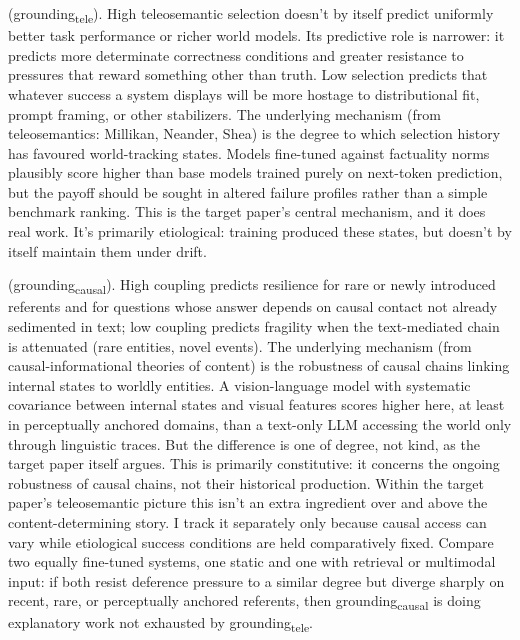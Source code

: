 \documentclass[12pt]{article}
\newcommand{\gtele}{grounding\textsubscript{tele}}
\newcommand{\gcausal}{grounding\textsubscript{causal}}
\begin{document}
 (\gtele{}). High teleosemantic selection doesn't by itself predict uniformly better task performance or richer world models. Its predictive role is narrower: it predicts more determinate correctness conditions and greater resistance to pressures that reward something other than truth. Low selection predicts that whatever success a system displays will be more hostage to distributional fit, prompt framing, or other stabilizers. The underlying mechanism (from teleosemantics: Millikan, Neander, Shea) is the degree to which selection history has favoured world-tracking states. Models fine-tuned against factuality norms plausibly score higher than base models trained purely on next-token prediction, but the payoff should be sought in altered failure profiles rather than a simple benchmark ranking. This is the target paper's central mechanism, and it does real work. It's primarily etiological: training produced these states, but doesn't by itself maintain them under drift.

 (\gcausal{}). High coupling predicts resilience for rare or newly introduced referents and for questions whose answer depends on causal contact not already sedimented in text; low coupling predicts fragility when the text-mediated chain is attenuated (rare entities, novel events). The underlying mechanism (from causal-informational theories of content) is the robustness of causal chains linking internal states to worldly entities. A vision-language model with systematic covariance between internal states and visual features scores higher here, at least in perceptually anchored domains, than a text-only LLM accessing the world only through linguistic traces. But the difference is one of degree, not kind, as the target paper itself argues. This is primarily constitutive: it concerns the ongoing robustness of causal chains, not their historical production. Within the target paper's teleosemantic picture this isn't an extra ingredient over and above the content-determining story. I track it separately only because causal access can vary while etiological success conditions are held comparatively fixed. Compare two equally fine-tuned systems, one static and one with retrieval or multimodal input: if both resist deference pressure to a similar degree but diverge sharply on recent, rare, or perceptually anchored referents, then \gcausal{} is doing explanatory work not exhausted by \gtele{}.
\end{document}
